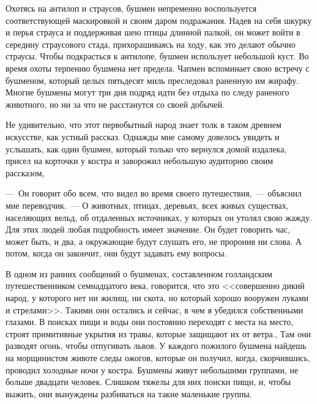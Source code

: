 \documentclass[12pt,a4paper,twoside,openany,svgnames]{memoir}
\begin{document}
Охотясь на антилоп и страусов, бушмен непременно воспользуется соответствующей маскировкой и своим даром подражания. Надев на себя шкурку и перья страуса и поддерживая шею птицы длинной палкой, он может войти в середину страусового стада, прихорашиваясь на ходу, как это делают обычно страусы. Чтобы подкрасться к антилопе, бушмен использует небольшой куст. Во время охоты терпению бушмена нет предела. Чапмен вспоминает свою встречу с бушменом, который целых пятьдесят миль преследовал раненную им жирафу. Многие бушмены могут три дня подряд идти без отдыха по следу раненого животного, но ни за что не расстанутся со своей добычей.

Не удивительно, что этот первобытный народ знает толк в таком древнем искусстве, как устный рассказ. Однажды мне самому довелось увидеть и услышать, как один бушмен, который только что вернулся домой издалека, присел на корточки у костра и заворожил небольшую аудиторию своим рассказом,

---~Он говорит обо всем, что видел во время своего путешествия,~--- объяснил мне переводчик.~--- О животных, птицах, деревьях, всех живых существах, населяющих вельд, об отдаленных источниках, у которых он утолял свою жажду. Для этих людей любая подробность имеет значение. Он будет говорить час, может быть, и два, а окружающие будут слушать его, не проронив ни слова. А потом, когда он закончит, они будут задавать ему вопросы.

В одном из ранних сообщений о бушменах, составленном голландским путешественником семнадцатого века, говорится, что это <<совершенно дикий народ, у которого нет ни жилищ, ни скота, но который хорошо вооружен луками и стрелами>>. Такими они остались и сейчас, в чем я убедился собственными глазами. В поисках пищи и воды они постоянно переходят с места на место, строят примитивные укрытия из травы, которые защищают их от ветра., Там они разводят огонь, чтобы отпугивать львов. У каждого пожилого бушмена найдешь на морщинистом животе следы ожогов, которые он получил, когда, скорчившись, проводил холодные ночи у костра. Бушмены живут небольшими группами, не больше двадцати человек. Слишком тяжелы для них поиски пищи, и, чтобы выжить, они вынуждены разбиваться на такие маленькие группы.
\end{document}
